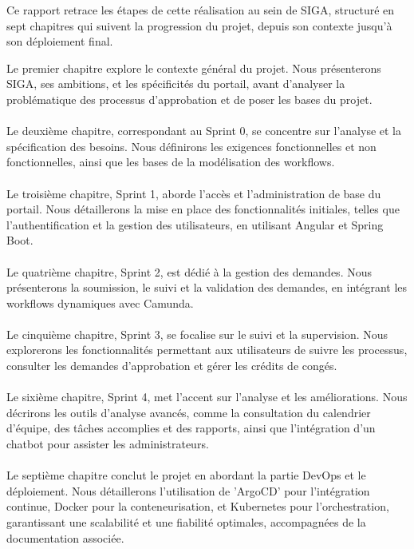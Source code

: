 Ce rapport retrace les étapes de cette réalisation au sein de SIGA, structuré en sept chapitres qui suivent la progression du projet, depuis son contexte jusqu’à son déploiement final.\\
\newpage

Le premier chapitre explore le contexte général du projet. Nous présenterons SIGA, ses ambitions, et les spécificités du portail, avant d’analyser la problématique des processus d’approbation et de poser les bases du projet.\\\\

Le deuxième chapitre, correspondant au Sprint 0, se concentre sur l’analyse et la spécification des besoins. Nous définirons les exigences fonctionnelles et non fonctionnelles, ainsi que les bases de la modélisation des workflows.\\\\

Le troisième chapitre, Sprint 1, aborde l’accès et l’administration de base du portail. Nous détaillerons la mise en place des fonctionnalités initiales, telles que l’authentification et la gestion des utilisateurs, en utilisant Angular et Spring Boot.\\\\

Le quatrième chapitre, Sprint 2, est dédié à la gestion des demandes. Nous présenterons la soumission, le suivi et la validation des demandes, en intégrant les workflows dynamiques avec Camunda.\\\\

Le cinquième chapitre, Sprint 3, se focalise sur le suivi et la supervision. Nous explorerons les fonctionnalités permettant aux utilisateurs de suivre les processus, consulter les demandes d’approbation et gérer les crédits de congés.\\\\

Le sixième chapitre, Sprint 4, met l’accent sur l’analyse et les améliorations. Nous décrirons les outils d’analyse avancés, comme la consultation du calendrier d’équipe, des tâches accomplies et des rapports, ainsi que l’intégration d’un chatbot pour assister les administrateurs.\\\\

Le septième chapitre conclut le projet en abordant la partie DevOps et le déploiement. Nous détaillerons l’utilisation de 'ArgoCD' pour l’intégration continue, Docker pour la conteneurisation, et Kubernetes pour l’orchestration, garantissant une scalabilité et une fiabilité optimales, accompagnées de la documentation associée.\\\\

